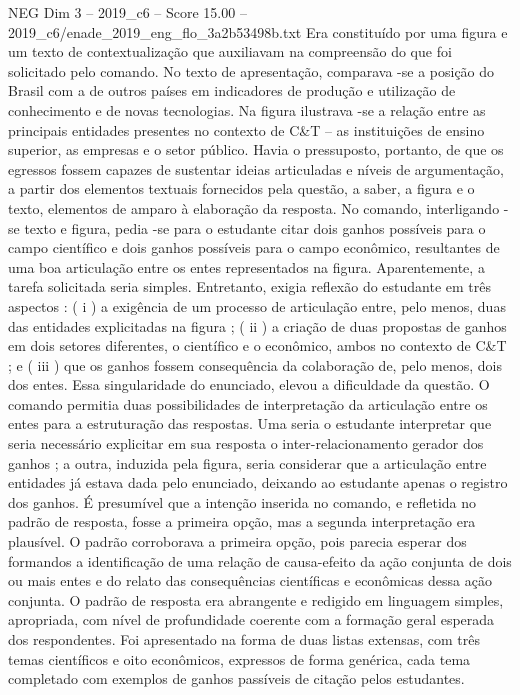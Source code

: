 \begin{textsample}{NEG Dim 3 – 2019\_c6 – Score 15.00 – 2019\_c6/enade\_2019\_eng\_flo\_3a2b53498b.txt}
Era constituído por uma figura e um texto de contextualização que auxiliavam na compreensão do que foi solicitado pelo comando.
No texto de apresentação, comparava -se a posição do Brasil com a de outros países em indicadores de produção e utilização de conhecimento e de novas tecnologias.
Na figura ilustrava -se a relação entre as principais entidades presentes no contexto de C\&T – as instituições de ensino superior, as empresas e o setor público.
Havia o pressuposto, portanto, de que os egressos fossem capazes de sustentar ideias articuladas e níveis de argumentação, a partir dos elementos textuais fornecidos pela questão, a saber, a figura e o texto, elementos de amparo à elaboração da resposta.
No comando, interligando -se texto e figura, pedia -se para o estudante citar dois ganhos possíveis para o campo científico e dois ganhos possíveis para o campo econômico, resultantes de uma boa articulação entre os entes representados na figura.
Aparentemente, a tarefa solicitada seria simples.
Entretanto, exigia reflexão do estudante em três aspectos : ( i ) a exigência de um processo de articulação entre, pelo menos, duas das entidades explicitadas na figura ; ( ii ) a criação de duas propostas de ganhos em dois setores diferentes, o científico e o econômico, ambos no contexto de C\&T ; e ( iii ) que os ganhos fossem consequência da colaboração de, pelo menos, dois dos entes.
Essa singularidade do enunciado, elevou a dificuldade da questão.
O comando permitia duas possibilidades de interpretação da articulação entre os entes para a estruturação das respostas.
Uma seria o estudante interpretar que seria necessário explicitar em sua resposta o inter-relacionamento gerador dos ganhos ; a outra, induzida pela figura, seria considerar que a articulação entre entidades já estava dada pelo enunciado, deixando ao estudante apenas o registro dos ganhos.
É presumível que a intenção inserida no comando, e refletida no padrão de resposta, fosse a primeira opção, mas a segunda interpretação era plausível.
O padrão corroborava a primeira opção, pois parecia esperar dos formandos a identificação de uma relação de causa-efeito da ação conjunta de dois ou mais entes e do relato das consequências científicas e econômicas dessa ação conjunta.
O padrão de resposta era abrangente e redigido em linguagem simples, apropriada, com nível de profundidade coerente com a formação geral esperada dos respondentes.
Foi apresentado na forma de duas listas extensas, com três temas científicos e oito econômicos, expressos de forma genérica, cada tema completado com exemplos de ganhos passíveis de citação pelos estudantes.

\end{textsample}
